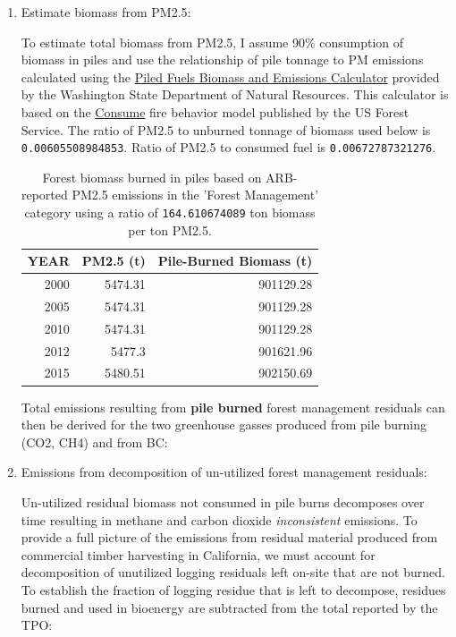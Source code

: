 \documentclass[a4paper]{article}
\begin{document}
\begin{enumerate}
\item Estimate biomass from PM2.5:
\label{sec-3-2-0-1}

To estimate total biomass from PM2.5, I assume 90\% consumption of biomass in piles and use the relationship of pile tonnage to PM emissions calculated using the \href{http://depts.washington.edu/nwfire/piles/}{Piled Fuels Biomass and Emissions Calculator} provided by the Washington State Department of Natural Resources. This calculator is based on the \href{http://www.fs.fed.us/pnw/fera/research/smoke/consume/index.shtml}{Consume} fire behavior model published by the US Forest Service. The ratio of PM2.5 to unburned tonnage of biomass used below is \texttt{0.00605508984853}. Ratio of PM2.5 to consumed fuel is \texttt{0.00672787321276}.


\begin{table}[htb]
\caption{Forest biomass burned in piles based on ARB-reported PM2.5 emissions in the 'Forest Management' category using a ratio of \texttt{164.610674089} ton biomass per ton PM2.5.}
\centering
\begin{tabular}{rrr}
YEAR & PM2.5 (t) & Pile-Burned Biomass (t)\\
\hline
2000 & 5474.31 & 901129.28\\
2005 & 5474.31 & 901129.28\\
2010 & 5474.31 & 901129.28\\
2012 & 5477.3 & 901621.96\\
2015 & 5480.51 & 902150.69\\
\end{tabular}
\end{table}

Total emissions resulting from \textbf{pile burned} forest management residuals
can then be derived for the two greenhouse gasses produced from pile
burning (CO2, CH4) and from BC:


\item Emissions from decomposition of un-utilized forest management residuals:
\label{sec-3-2-0-2}

Un-utilized residual biomass not consumed in pile burns decomposes over
time resulting in methane and carbon dioxide \emph{\emph{inconsistent}} emissions. To provide a
full picture of the emissions from residual material produced from
commercial timber harvesting in California, we must account for decomposition 
of unutilized logging residuals left on-site that are not burned. To establish
 the fraction of logging residue that is left to
decompose, residues burned and used in bioenergy are subtracted from the
total reported by the TPO:


\end{enumerate}
\end{document}
